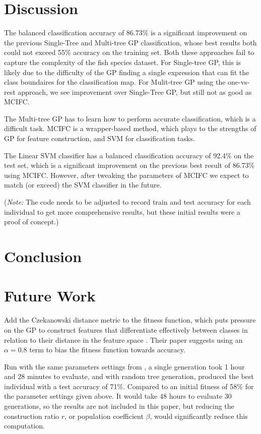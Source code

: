 \documentclass[runningheads]{llncs}
\begin{document}
\section{Discussion}

The balanced classification accuracy of 86.73\% is a significant improvement on the previous Single-Tree and Multi-tree GP classification, whose best results both could not exceed 55\% accuracy on the training set. Both these approaches fail to capture the complexity of the fish species dataset. For Single-tree GP, this is likely due to the difficulty of the GP finding a single expression that can fit the class boundaires for the classification map. For Mulit-tree GP using the one-vs-rest approach, we see improvement over Single-Tree GP, but still not as good as MCIFC. 

The Multi-tree GP has to learn how to perform accurate classification, which is a difficult task. MCIFC is a wrapper-based method, which plays to the strengths of GP for feature construction, and SVM for classification tasks. 

The Linear SVM classifier has a balanced classification accuracy of 92.4\% on the test set, which is a significant improvement on the previous best result of 86.73\% using MCIFC. However, after tweaking the parameters of MCIFC we expect to match (or exceed) the SVM classifier in the future.

(\emph{Note:} The code needs to be adjusted to record train and test accuracy for each individual to get more comprehensive results, but these initial results were a proof of concept.) 

\section{Conclusion}

\section{Future Work}

Add the Czekanowski distance metric to the fitness function, which puts pressure on the GP to construct features that differentiate effectively between classes in relation to their distance in the feature space \cite{tran2019genetic}. Their paper suggests using an $\alpha = 0.8$ term to bias the fitness function towards accuracy.

Run with the same parameters settings from \cite{tran2019genetic}, a single generation took 1 hour and 28 minutes to evaluate, and with random tree generation, produced the best individual with a test accuracy of 71\%. Compared to an initial fitness of 58\% for the parameter settings given above. It would take 48 hours to evaluate 30 generations, so the results are not included in this paper, but reducing the construction ratio $r$, or population coefficient $\beta$, would significantly reduce this computation. 
\end{document}
